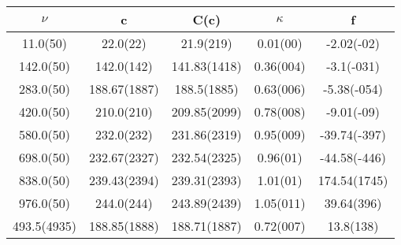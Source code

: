 \begin{table}[H]
	\centering
	\begin{tabular}{ccccc}
		$\nu$ & c & C(c) & $\kappa$ & f\\
		\hline
		11.0(50) & 22.0(22) & 21.9(219) & 0.01(00) & -2.02(-02)	\\
		142.0(50) & 142.0(142) & 141.83(1418) & 0.36(004) & -3.1(-031)	\\
		283.0(50) & 188.67(1887) & 188.5(1885) & 0.63(006) & -5.38(-054)	\\
		420.0(50) & 210.0(210) & 209.85(2099) & 0.78(008) & -9.01(-09)	\\
		580.0(50) & 232.0(232) & 231.86(2319) & 0.95(009) & -39.74(-397)	\\
		698.0(50) & 232.67(2327) & 232.54(2325) & 0.96(01) & -44.58(-446)	\\
		838.0(50) & 239.43(2394) & 239.31(2393) & 1.01(01) & 174.54(1745)	\\
		976.0(50) & 244.0(244) & 243.89(2439) & 1.05(011) & 39.64(396)	\\
		493.5(4935) & 188.85(1888) & 188.71(1887) & 0.72(007) & 13.8(138)	\\
	\end{tabular}
\end{table}